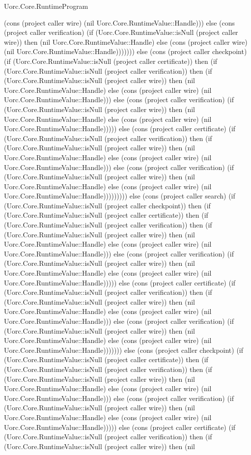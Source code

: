 \begin{lexlean}{Uorc.Core.RuntimeProgram}
\begin{semanticmodule}
{(cons (project caller wire) (nil Uorc.Core.RuntimeValue::Handle))) else (cons (project caller verification) (if (Uorc.Core.RuntimeValue::isNull (project caller wire)) then (nil Uorc.Core.RuntimeValue::Handle) else (cons (project caller wire) (nil Uorc.Core.RuntimeValue::Handle))))))) else (cons (project caller checkpoint) (if (Uorc.Core.RuntimeValue::isNull (project caller certificate)) then (if (Uorc.Core.RuntimeValue::isNull (project caller verification)) then (if (Uorc.Core.RuntimeValue::isNull (project caller wire)) then (nil Uorc.Core.RuntimeValue::Handle) else (cons (project caller wire) (nil Uorc.Core.RuntimeValue::Handle))) else (cons (project caller verification) (if (Uorc.Core.RuntimeValue::isNull (project caller wire)) then (nil Uorc.Core.RuntimeValue::Handle) else (cons (project caller wire) (nil Uorc.Core.RuntimeValue::Handle))))) else (cons (project caller certificate) (if (Uorc.Core.RuntimeValue::isNull (project caller verification)) then (if (Uorc.Core.RuntimeValue::isNull (project caller wire)) then (nil Uorc.Core.RuntimeValue::Handle) else (cons (project caller wire) (nil Uorc.Core.RuntimeValue::Handle))) else (cons (project caller verification) (if (Uorc.Core.RuntimeValue::isNull (project caller wire)) then (nil Uorc.Core.RuntimeValue::Handle) else (cons (project caller wire) (nil Uorc.Core.RuntimeValue::Handle))))))))) else (cons (project caller search) (if (Uorc.Core.RuntimeValue::isNull (project caller checkpoint)) then (if (Uorc.Core.RuntimeValue::isNull (project caller certificate)) then (if (Uorc.Core.RuntimeValue::isNull (project caller verification)) then (if (Uorc.Core.RuntimeValue::isNull (project caller wire)) then (nil Uorc.Core.RuntimeValue::Handle) else (cons (project caller wire) (nil Uorc.Core.RuntimeValue::Handle))) else (cons (project caller verification) (if (Uorc.Core.RuntimeValue::isNull (project caller wire)) then (nil Uorc.Core.RuntimeValue::Handle) else (cons (project caller wire) (nil Uorc.Core.RuntimeValue::Handle))))) else (cons (project caller certificate) (if (Uorc.Core.RuntimeValue::isNull (project caller verification)) then (if (Uorc.Core.RuntimeValue::isNull (project caller wire)) then (nil Uorc.Core.RuntimeValue::Handle) else (cons (project caller wire) (nil Uorc.Core.RuntimeValue::Handle))) else (cons (project caller verification) (if (Uorc.Core.RuntimeValue::isNull (project caller wire)) then (nil Uorc.Core.RuntimeValue::Handle) else (cons (project caller wire) (nil Uorc.Core.RuntimeValue::Handle))))))) else (cons (project caller checkpoint) (if (Uorc.Core.RuntimeValue::isNull (project caller certificate)) then (if (Uorc.Core.RuntimeValue::isNull (project caller verification)) then (if (Uorc.Core.RuntimeValue::isNull (project caller wire)) then (nil Uorc.Core.RuntimeValue::Handle) else (cons (project caller wire) (nil Uorc.Core.RuntimeValue::Handle))) else (cons (project caller verification) (if (Uorc.Core.RuntimeValue::isNull (project caller wire)) then (nil Uorc.Core.RuntimeValue::Handle) else (cons (project caller wire) (nil Uorc.Core.RuntimeValue::Handle))))) else (cons (project caller certificate) (if (Uorc.Core.RuntimeValue::isNull (project caller verification)) then (if (Uorc.Core.RuntimeValue::isNull (project caller wire)) then (nil }
\end{semanticmodule}
\end{lexlean}

